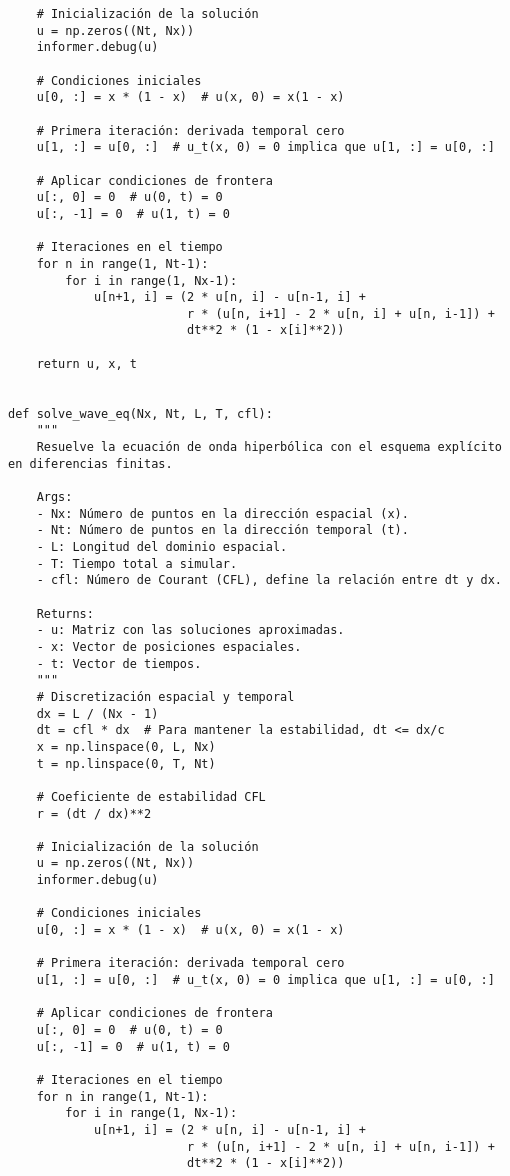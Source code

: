 \begin{verbatim}
    # Inicialización de la solución
    u = np.zeros((Nt, Nx))
    informer.debug(u)
    
    # Condiciones iniciales
    u[0, :] = x * (1 - x)  # u(x, 0) = x(1 - x)
    
    # Primera iteración: derivada temporal cero
    u[1, :] = u[0, :]  # u_t(x, 0) = 0 implica que u[1, :] = u[0, :]
    
    # Aplicar condiciones de frontera
    u[:, 0] = 0  # u(0, t) = 0
    u[:, -1] = 0  # u(1, t) = 0
    
    # Iteraciones en el tiempo
    for n in range(1, Nt-1):
        for i in range(1, Nx-1):
            u[n+1, i] = (2 * u[n, i] - u[n-1, i] +
                         r * (u[n, i+1] - 2 * u[n, i] + u[n, i-1]) +
                         dt**2 * (1 - x[i]**2))
    
    return u, x, t


def solve_wave_eq(Nx, Nt, L, T, cfl):
    """
    Resuelve la ecuación de onda hiperbólica con el esquema explícito en diferencias finitas.
    
    Args:
    - Nx: Número de puntos en la dirección espacial (x).
    - Nt: Número de puntos en la dirección temporal (t).
    - L: Longitud del dominio espacial.
    - T: Tiempo total a simular.
    - cfl: Número de Courant (CFL), define la relación entre dt y dx.
    
    Returns:
    - u: Matriz con las soluciones aproximadas.
    - x: Vector de posiciones espaciales.
    - t: Vector de tiempos.
    """
    # Discretización espacial y temporal
    dx = L / (Nx - 1)
    dt = cfl * dx  # Para mantener la estabilidad, dt <= dx/c
    x = np.linspace(0, L, Nx)
    t = np.linspace(0, T, Nt)
    
    # Coeficiente de estabilidad CFL
    r = (dt / dx)**2
    
    # Inicialización de la solución
    u = np.zeros((Nt, Nx))
    informer.debug(u)
    
    # Condiciones iniciales
    u[0, :] = x * (1 - x)  # u(x, 0) = x(1 - x)
    
    # Primera iteración: derivada temporal cero
    u[1, :] = u[0, :]  # u_t(x, 0) = 0 implica que u[1, :] = u[0, :]
    
    # Aplicar condiciones de frontera
    u[:, 0] = 0  # u(0, t) = 0
    u[:, -1] = 0  # u(1, t) = 0
    
    # Iteraciones en el tiempo
    for n in range(1, Nt-1):
        for i in range(1, Nx-1):
            u[n+1, i] = (2 * u[n, i] - u[n-1, i] +
                         r * (u[n, i+1] - 2 * u[n, i] + u[n, i-1]) +
                         dt**2 * (1 - x[i]**2))
    

\end{verbatim}
